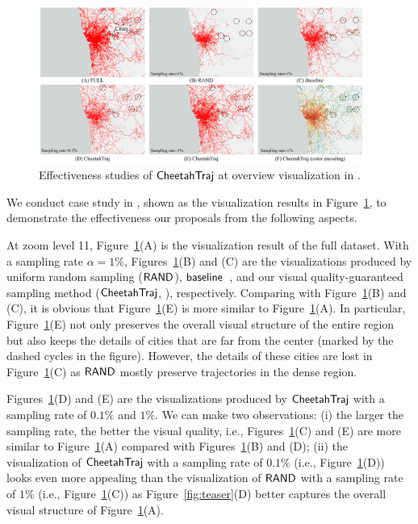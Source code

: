 \begin{figure}[t]
	\centering
	\includegraphics[width=0.95\textwidth]{pictures/case_study_icde/case_study_overview.pdf}
	\vspace{-3mm}
	\caption{Effectiveness studies of $\mathsf{CheetahTraj}$ at overview visualization in \pt{}.}
	\label{fig:overview}
	\vspace{-2mm}
\end{figure}


We conduct case study in \pt{}, shown as the visualization results in Figure~\ref{fig:overview}, to demonstrate the effectiveness our proposals from the following aspects.

At zoom level 11, Figure~\ref{fig:overview}(A) is the visualization result of the full \pt{} dataset.
With a sampling rate $\alpha \!=\! 1\%$, Figures~\ref{fig:overview}(B) and (C) are the visualizations produced by uniform random sampling ($\mathsf{RAND}$), $\mathsf{baseline}$~\cite{borcan2012improving},   
and our visual quality-guaranteed sampling method ($\mathsf{CheetahTraj}$, ), respectively. Comparing with Figure~\ref{fig:overview}(B) and (C), it is obvious that Figure~\ref{fig:overview}(E) is more similar to Figure~\ref{fig:overview}(A). In particular, Figure~\ref{fig:overview}(E) not only preserves the overall visual structure of the entire region but also keeps the details of cities that are far from the center (marked by the dashed cycles in the figure). However, the details of these cities are lost in Figure~\ref{fig:overview}(C) as $\mathsf{RAND}{}$ mostly preserve trajectories in the dense region.  

Figures~\ref{fig:overview}(D) and (E) are the visualizations produced by $\mathsf{CheetahTraj}{}$ with a sampling rate of $0.1\%$ and $1\%$. We can make two observations: (i) the larger the sampling rate, the better the visual quality, i.e., Figures~\ref{fig:overview}(C) and (E) are more similar to Figure~\ref{fig:overview}(A) compared with Figures~\ref{fig:overview}(B) and (D); (ii) the visualization of $\mathsf{CheetahTraj}$ with a sampling rate of $0.1\%$ (i.e., Figure~\ref{fig:overview}(D)) looks even more appealing than the visualization of $\mathsf{RAND}{}$ with a sampling rate of $1\%$ (i.e., Figure~\ref{fig:overview}(C)) as Figure~\ref{fig:teaser}(D) better captures the overall visual structure of Figure~\ref{fig:overview}(A).


